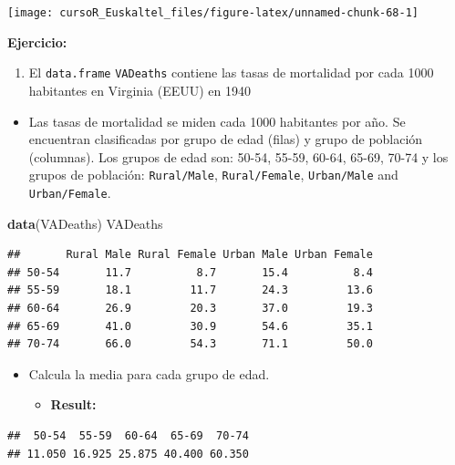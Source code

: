 \documentclass[]{book}
\newenvironment{Shaded}{\begin{snugshade}}{\end{snugshade}}
\newcommand{\KeywordTok}[1]{\textcolor[rgb]{0.13,0.29,0.53}{\textbf{#1}}}
\newcommand{\NormalTok}[1]{#1}
\providecommand{\tightlist}{%
  \setlength{\itemsep}{0pt}\setlength{\parskip}{0pt}}
\begin{document}
\begin{center}\texttt{[image: cursoR\_Euskaltel\_files/figure-latex/unnamed-chunk-68-1]} \end{center}

\textbf{Ejercicio:}

\begin{enumerate}
\def\labelenumi{\arabic{enumi}.}
\tightlist
\item
  El \texttt{data.frame} \texttt{VADeaths} contiene las tasas de
  mortalidad por cada 1000 habitantes en Virginia (EEUU) en 1940
\end{enumerate}

\begin{itemize}
\tightlist
\item
  Las tasas de mortalidad se miden cada 1000 habitantes por año. Se
  encuentran clasificadas por grupo de edad (filas) y grupo de población
  (columnas). Los grupos de edad son: 50-54, 55-59, 60-64, 65-69, 70-74
  y los grupos de población: \texttt{Rural/Male}, \texttt{Rural/Female},
  \texttt{Urban/Male} and \texttt{Urban/Female}.
\end{itemize}

\begin{Shaded}
\begin{Highlighting}[]
\KeywordTok{data}\NormalTok{(VADeaths)}
\NormalTok{VADeaths}
\end{Highlighting}
\end{Shaded}

\begin{verbatim}
##       Rural Male Rural Female Urban Male Urban Female
## 50-54       11.7          8.7       15.4          8.4
## 55-59       18.1         11.7       24.3         13.6
## 60-64       26.9         20.3       37.0         19.3
## 65-69       41.0         30.9       54.6         35.1
## 70-74       66.0         54.3       71.1         50.0
\end{verbatim}

\begin{itemize}
\item
  Calcula la media para cada grupo de edad.

  \begin{itemize}
  \tightlist
  \item
    \textbf{Result:}
  \end{itemize}
\end{itemize}

\begin{verbatim}
##  50-54  55-59  60-64  65-69  70-74 
## 11.050 16.925 25.875 40.400 60.350
\end{verbatim}
\end{document}
